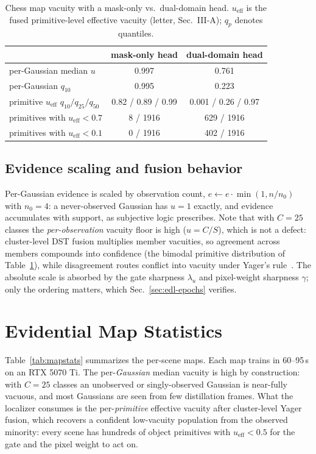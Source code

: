 \documentclass[journal]{IEEEtran}
\begin{document}
\begin{table}[t]
\caption{Chess map vacuity with a mask-only vs.\ dual-domain head.
$u_{\mathrm{eff}}$ is the fused primitive-level effective vacuity
(letter, Sec.~III-A); $q_p$ denotes quantiles.}
\label{tab:dual-domain}
\centering\footnotesize
\setlength{\tabcolsep}{3.5pt}
\begin{tabular}{@{}lcc@{}}
\toprule
 & mask-only head & dual-domain head \\
\midrule
per-Gaussian median $u$ & 0.997 & 0.761 \\
per-Gaussian $q_{10}$ & 0.995 & 0.223 \\
primitive $u_{\mathrm{eff}}$ $q_{10}/q_{25}/q_{50}$ & 0.82 / 0.89 / 0.99 & 0.001 / 0.26 / 0.97 \\
primitives with $u_{\mathrm{eff}}{<}0.7$ & 8 / 1916 & 629 / 1916 \\
primitives with $u_{\mathrm{eff}}{<}0.1$ & 0 / 1916 & 402 / 1916 \\
\bottomrule
\end{tabular}
\end{table}

\subsection{Evidence scaling and fusion behavior}
Per-Gaussian evidence is scaled by observation count,
$e \leftarrow e \cdot \min(1, n/n_0)$ with $n_0{=}4$: a never-observed
Gaussian has $u{=}1$ exactly, and evidence accumulates with support, as
subjective logic prescribes. Note that with $C{=}25$ classes the
\emph{per-observation} vacuity floor is high ($u = C/S$), which is not a
defect: cluster-level DST fusion multiplies member vacuities, so agreement
across members compounds into confidence (the bimodal primitive distribution
of Table~\ref{tab:dual-domain}), while disagreement routes conflict into
vacuity under Yager's rule~\cite{yager,dst}. The absolute scale is absorbed by the gate
sharpness $\lambda_u$ and pixel-weight sharpness $\gamma$; only the ordering
matters, which Sec.~\ref{sec:edl-epochs} verifies.

\section{Evidential Map Statistics}
\label{sec:mapstats}
Table~\ref{tab:mapstats} summarizes the per-scene maps. Each map trains in
60--95\,s on an RTX 5070 Ti. The per-\emph{Gaussian} median vacuity is high
by construction: with $C{=}25$ classes an unobserved or singly-observed
Gaussian is near-fully vacuous, and most Gaussians are seen from few
distillation frames. What the localizer consumes is the per-\emph{primitive}
effective vacuity after cluster-level Yager fusion, which recovers a
confident low-vacuity population from the observed minority: every scene has
hundreds of object primitives with $u_\text{eff}<0.5$ for the gate and the
pixel weight to act on.
\end{document}
